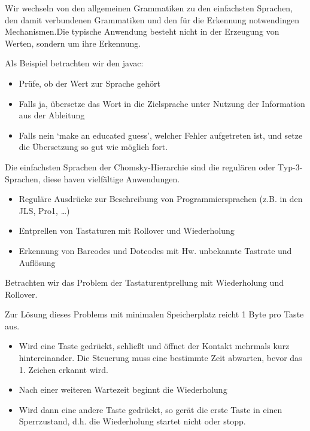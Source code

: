 \documentclass[11pt, a4paper]{article}
\begin{document}
\begin{flushleft}

    Wir wechseln von den allgemeinen Grammatiken zu den einfachsten Sprachen, den damit verbundenen Grammatiken und den für die Erkennung notwendingen Mechanismen.Die typische Anwendung besteht nicht in der Erzeugung von Werten, sondern um ihre Erkennung.

    Als Beispiel betrachten wir den javac:

    \begin{itemize}[-]
        \item Prüfe, ob der Wert zur Sprache gehört
        \item Falls ja, übersetze das Wort in die Zielsprache unter Nutzung der Information aus der Ableitung
        \item Falls nein `make an educated guess', welcher Fehler aufgetreten ist, und setze die Übersetzung so gut wie möglich fort.
    \end{itemize}

    Die einfachsten Sprachen der Chomsky-Hierarchie sind die regulären oder Typ-3-Sprachen, diese haven vielfältige Anwendungen.

    \begin{itemize}[-]
        \item Reguläre Ausdrücke zur Beschreibung von Programmiersprachen (z.B. in den JLS, Pro1, \ldots)
        \item Entprellen von Tastaturen mit Rollover und Wiederholung
        \item Erkennung von Barcodes und Dotcodes mit Hw. unbekannte Tastrate und Auflösung
    \end{itemize}

    Betrachten wir das Problem der Tastaturentprellung mit Wiederholung und Rollover.

    Zur Lösung dieses Problems mit minimalen Speicherplatz reicht 1 Byte pro Taste aus.
    \begin{itemize}[-]
        \item Wird eine Taste gedrückt, schließt und öffnet der Kontakt mehrmals kurz hintereinander. Die Steuerung muss eine bestimmte Zeit abwarten, bevor das 1. Zeichen erkannt wird.
        \item Nach einer weiteren Wartezeit beginnt die Wiederholung
        \item Wird dann eine andere Taste gedrückt, so gerät die erste Taste in einen Sperrzustand, d.h. die Wiederholung startet nicht oder stopp.
    \end{itemize}


\end{flushleft}
\end{document}
